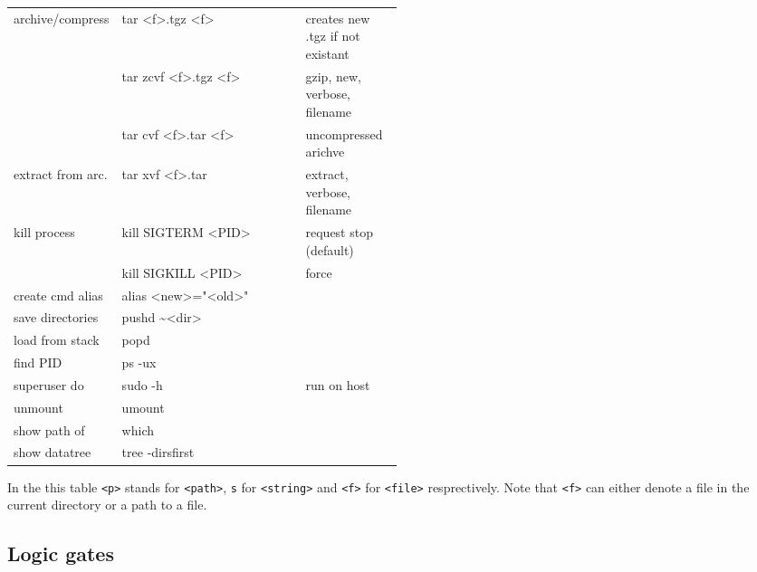 {    \begin{tabularx}{\linewidth}{@{} p{0.25\linewidth}>{\ttfamily}lp{0.25\linewidth} @{}}
        archive/compress  & tar <f>.tgz <f>            & creates new .tgz if not existant \\ %
                          & tar zcvf <f>.tgz <f>       & gzip, new, verbose, filename     \\
                          & tar cvf <f>.tar <f>        & uncompressed arichve             \\
        extract from arc. & tar xvf <f>.tar            & extract, verbose, filename       \\
        kill process      & kill SIGTERM <PID>         & request stop (default)           \\
                          & kill SIGKILL <PID>         & force                            \\
        create cmd alias  & alias <new>="<old>"        &                                  \\ %
        save directories  & pushd \textasciitilde<dir> &                                  \\
        load from stack   & popd                       &                                  \\
        find PID          & ps -ux                     &                                  \\
        superuser do      & sudo -h                    & run on host                      \\
        unmount           & umount                     &                                  \\
        show path of      & which                      &                                  \\
        show datatree     & tree -dirsfirst            &                                  \\
        \bottomrule
    \end{tabularx}

} %

\renewcommand{\arraystretch}{1}
\setlength{\tabcolsep}{\oldtabcolsep}

In the this table \texttt{<p>} stands for \texttt{<path>}, \texttt{s} for \texttt{<string>} and \texttt{<f>} for \texttt{<file>} resprectively. Note that \texttt{<f>} can either denote a file in the current directory or a path to a file.

\subsection{Logic gates}

